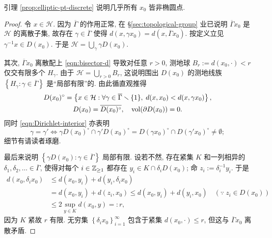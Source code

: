 引理 \ref{prop:elliptic-pt-discrete} 说明几乎所有 $x_0$ 皆非椭圆点.
\begin{proof}
	令 $x \in \mathcal{H}$. 因为 $\overline{\Gamma}$ 的作用正常, 在 \S\ref{sec:topological-group} 业已说明 $\overline{\Gamma} x_0$ 是 $\mathcal{H}$ 的离散子集, 故存在 $\gamma \in \overline{\Gamma}$ 使得 $d(x, \gamma x_0) = d(x, \overline{\Gamma} x_0)$. 按定义立见 $\gamma^{-1}x \in D(x_0)$. 于是 $\mathcal{H} = \bigcup_\gamma \gamma D(x_0)$.
	
	其次, $\overline{\Gamma} x_0$ 离散配上 \eqref{eqn:bisector-d} 导致对任意 $r > 0$, 测地球 $B_r := d(x_0, \cdot) < r$ 仅交有限多个 $H_\gamma$. 由于 $\mathcal{H} = \bigcup_{r > 0} B_r$, 这说明围出 $D(x_0)$ 的测地线族 $\left\{ H_\gamma : \gamma \in \overline{\Gamma} \right\}$ 是``局部有限''的. 由此循直观推得
	\begin{equation}\label{eqn:Dirichlet-interior}\begin{gathered}
		D(x_0)^\circ = \left\{ x \in \mathcal{H}: \forall \gamma \in \overline{\Gamma} \smallsetminus \{1\}, \; d(x, x_0) < d(x, \gamma x_0) \right\}, \\
		D(x_0) = \overline{D(x_0)^\circ}, \quad \operatorname{vol}(\partial D(x_0)) = 0.
	\end{gathered}\end{equation}
	同时 \eqref{eqn:Dirichlet-interior} 亦表明
	\[ \gamma = \gamma' \iff \gamma D(x_0)^\circ \cap \gamma' D(x_0)^\circ = D(\gamma x_0)^\circ \cap D(\gamma' x_0)^\circ \neq \emptyset; \]
	细节有请读者琢磨.
	
	最后来说明 $\left\{ \gamma D(x_0) : \gamma \in \overline{\Gamma} \right\}$ 局部有限. 设若不然, 存在紧集 $K$ 和一列相异的 $\delta_1, \delta_2, \ldots \in \overline{\Gamma}$, 使得对每个 $i \in \mathbb{Z}_{\geq 1}$ 都存在 $y_i \in K \cap \delta_i D(x_0)$; 命 $z_i := \delta_i^{-1} y_i$. 于是
	\begin{align*}
		d(x_0, \delta_i x_0) & \leq d(x_0, y_i) + d(y_i, \delta_i x_0) \\
		& = d(x_0, y_i) + d(z_i, x_0) \leq d(x_0, y_i) + d(y_i, x_0) \quad \left(\because \; z_i \in D(x_0)\right) \\
		& \leq 2 \sup_{y \in K} d(x_0, y) =: r,
	\end{align*}
	因为 $K$ 紧故 $r$ 有限. 无穷集 $\left\{ \delta_i x_0 \right\}_{i=1}^\infty$ 包含于紧集 $d(x_0, \cdot) \leq r$, 但这与 $\overline{\Gamma} x_0$ 离散矛盾.
\end{proof}


